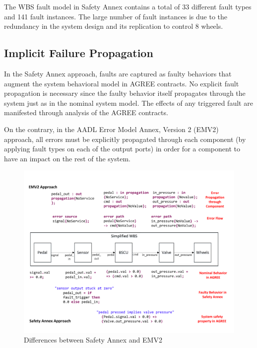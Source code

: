 The WBS fault model in Safety Annex contains a total of 33 different fault types and 141 fault instances. The large number of fault instances is due to the redundancy in the system design and its replication to control 8 wheels.

\subsection{Implicit Failure Propagation}
In the Safety Annex approach, faults are captured as faulty behaviors that augment the system behavioral model in AGREE contracts. No explicit fault propagation is necessary since the faulty behavior itself propagates through the system just as in the nominal system model. The effects of any triggered fault are manifested through analysis of the AGREE contracts. 

On the contrary, in the AADL Error Model Annex, Version 2 (EMV2)~\cite{EMV2} approach, all errors must be explicitly propagated through each component (by applying fault types on each of the output ports) in order for a component to have an impact on the rest of the system. 

\begin{figure}[t]
	\vspace{-0.19in}
	\centering
	\includegraphics[trim=0 9 0 5,clip,width=\textwidth]{images/Comparison_with_EMV2.pdf}
	\caption{Differences between Safety Annex and EMV2}
	\label{fig:comparison_with_EMV2}
\end{figure} 

